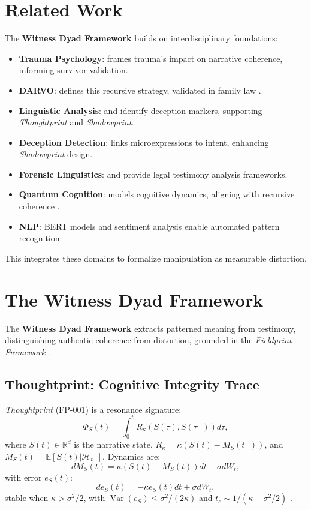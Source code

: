 \documentclass[11pt]{article}
\newcommand{\thoughtprint}{\textit{Thoughtprint}}
\newcommand{\shadowprint}{\textit{Shadowprint}}
\newcommand{\witnessdyad}{\textbf{Witness Dyad Framework}}
\begin{document}
\section{Related Work}
\label{sec:related}
The \witnessdyad{} builds on interdisciplinary foundations:
\begin{itemize}
    \item \textbf{Trauma Psychology}: \citet{herman1992} frames trauma's impact on narrative coherence, informing survivor validation.
    \item \textbf{DARVO}: \citet{freyd1997} defines this recursive strategy, validated in family law \citep{meier2010}.
    \item \textbf{Linguistic Analysis}: \citet{pennebaker2003} and \citet{shuy1993} identify deception markers, supporting \thoughtprint{} and \shadowprint{}.
    \item \textbf{Deception Detection}: \citet{ekman2003} links microexpressions to intent, enhancing \shadowprint{} design.
    \item \textbf{Forensic Linguistics}: \citet{tiersma2002} and \citet{shuy1993} provide legal testimony analysis frameworks.
    \item \textbf{Quantum Cognition}: \citet{busemeyer2012} models cognitive dynamics, aligning with recursive coherence \citep{havens2025a}.
    \item \textbf{NLP}: BERT models \citep{devlin2019} and sentiment analysis \citep{hutto2014} enable automated pattern recognition.
\end{itemize}
This integrates these domains to formalize manipulation as measurable distortion.

\section{The Witness Dyad Framework}
\label{sec:framework}
The \witnessdyad{} extracts patterned meaning from testimony, distinguishing authentic coherence from distortion, grounded in the \textit{Fieldprint Framework} \citep{havens2025b}.

\subsection{Thoughtprint: Cognitive Integrity Trace}
\label{subsec:thoughtprint}
\thoughtprint{} (FP-001) is a resonance signature:
\[
\Phi_S(t) = \int_0^t R_\kappa(S(\tau), S(\tau^-)) d\tau,
\]
where \(S(t) \in \mathbb{R}^d\) is the narrative state, \(R_\kappa = \kappa(S(t) - M_S(t^-))\), and \(M_S(t) = \mathbb{E}[S(t) | \mathcal{H}_{t^-}]\). Dynamics are:
\[
dM_S(t) = \kappa(S(t) - M_S(t))dt + \sigma dW_t,
\]
with error \(e_S(t)\):
\[
de_S(t) = -\kappa e_S(t)dt + \sigma dW_t,
\]
stable when \(\kappa > \sigma^2/2\), with \(\operatorname{Var}(e_S) \leq \sigma^2/(2\kappa)\) and \(t_c \sim 1/(\kappa - \sigma^2/2)\) \citep{havens2025b}.
\end{document}
